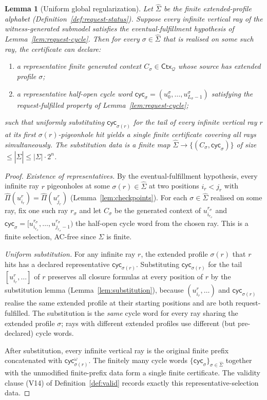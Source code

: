 \documentclass[11pt]{article}
\newtheorem{lemma}[theorem]{Lemma}
\newcommand{\Q}{\mathcal Q}
\newcommand{\Ctx}{\mathsf{Ctx}}
\newcommand{\extProf}{\widehat\Pi}
\newcommand{\extSigma}{\widehat\Sigma}
\begin{document}
\begin{lemma}[Uniform global regularization]\label{lem:global-rep}
Let $\extSigma$ be the finite extended-profile alphabet
(Definition~\ref{def:request-status}).  Suppose every infinite
vertical ray of the witness-generated submodel satisfies the
eventual-fulfillment hypothesis of
Lemma~\ref{lem:request-cycle}.  Then for every
$\sigma\in\extSigma$ that is realised on some such ray, the
certificate can declare:
\begin{enumerate}[label=(\arabic*)]
\item a representative finite generated context $C_\sigma\in
  \Ctx_\Q$ whose source has extended profile $\sigma$;
\item a representative half-open cycle word
  $\mathsf{cyc}_\sigma=(u_0^\sigma,\ldots,u_{L_\sigma-1}^\sigma)$
  satisfying the request-fulfilled property of
  Lemma~\ref{lem:request-cycle};
\end{enumerate}
such that uniformly substituting $\mathsf{cyc}_{\sigma(r)}$ for the
tail of every infinite vertical ray $r$ at its first
$\sigma(r)$-pigeonhole hit yields a single finite certificate
covering all rays simultaneously.  The substitution data is a finite
map $\extSigma\to\{(C_\sigma,\mathsf{cyc}_\sigma)\}$ of size
$\le|\extSigma|\le|\Sigma|\cdot 2^n$.
\end{lemma}

\begin{proof}
\emph{Existence of representatives.}  By the eventual-fulfillment
hypothesis, every infinite ray $r$ pigeonholes at some
$\sigma(r)\in\extSigma$ at two positions $i_r<j_r$ with
$\extProf(u_{i_r}^r)=\extProf(u_{j_r}^r)$
(Lemma~\ref{lem:checkpoints}).  For each
$\sigma\in\extSigma$ realised on some ray, fix one such ray
$r_\sigma$ and let $C_\sigma$ be the generated context of
$u_{i_{r_\sigma}}^{r_\sigma}$ and
$\mathsf{cyc}_\sigma=[u_{i_{r_\sigma}}^{r_\sigma},\ldots,
u_{j_{r_\sigma}-1}^{r_\sigma})$ the half-open cycle word from the
chosen ray.  This is a finite selection, AC-free since $\extSigma$
is finite.

\emph{Uniform substitution.}  For any infinite ray $r$, the
extended profile $\sigma(r)$ that $r$ hits has a declared
representative $\mathsf{cyc}_{\sigma(r)}$.  Substituting
$\mathsf{cyc}_{\sigma(r)}$ for the tail $[u_{i_r}^r,\ldots]$ of $r$
preserves all closure formulas at every position of $r$ by the
substitution lemma (Lemma~\ref{lem:substitution}), because
$(u_{i_r}^r,\ldots)$ and $\mathsf{cyc}_{\sigma(r)}$ realise the
same extended profile at their starting positions and are both
request-fulfilled.  The substitution is the \emph{same} cycle word
for every ray sharing the extended profile $\sigma$; rays with
different extended profiles use different (but pre-declared) cycle
words.

After substitution, every infinite vertical ray is the original
finite prefix concatenated with $\mathsf{cyc}_{\sigma(r)}^\omega$.
The finitely many cycle words
$\{\mathsf{cyc}_\sigma\}_{\sigma\in\extSigma}$ together with the
unmodified finite-prefix data form a single finite certificate.
The validity clause (V14) of Definition~\ref{def:valid} records
exactly this representative-selection data.
\end{proof}
\end{document}

